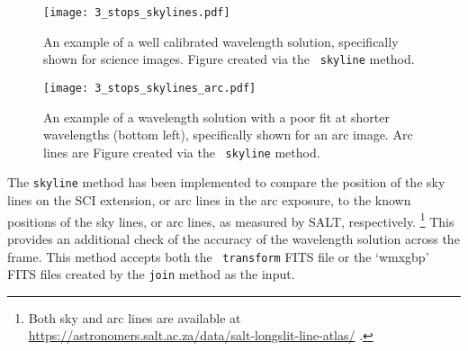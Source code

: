\begin{figure}[t]
    \centering
    \texttt{[image: 3\_stops\_skylines.pdf]}
    \caption{An example of a well calibrated wavelength solution, specifically shown for science images. Figure created via the \stops\ \texttt{skyline} method.}
    \label{fig:stops_sky_eg}
\end{figure}
\begin{figure}[t]
    \centering
    \texttt{[image: 3\_stops\_skylines\_arc.pdf]}
    \caption{An example of a wavelength solution with a poor fit at shorter wavelengths (bottom left), specifically shown for an arc image. Arc lines are Figure created via the \stops\ \texttt{skyline} method.}
    \label{fig:stops_sky_arc_eg}
\end{figure}

The \texttt{skyline} method has been implemented to compare the position of the sky lines on the \gls{SCI} extension, or arc lines in the arc exposure, to the known positions of the sky lines, or arc lines, as measured by \gls{SALT}, respectively.%
\footnote{Both sky and arc lines are available at \url{https://astronomers.salt.ac.za/data/salt-longslit-line-atlas/} .}
This provides an additional check of the accuracy of the wavelength solution across the frame. This method accepts both the \iraf\ \texttt{transform} \gls{FITS} file or the `wmxgbp' \gls{FITS} files created by the \texttt{join} method as the input.

